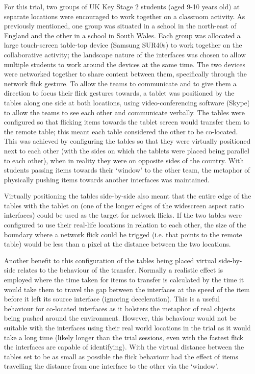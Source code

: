 \documentclass[a4paper,11pt]{article}
\begin{document}
For this trial, two groups of UK Key Stage 2 students (aged 9-10 years old) at separate locations were encouraged to work together on a classroom activity.
As previously mentioned, one group was situated in a school in the north-east of England and the other in a school in South Wales.
Each group was allocated a large touch-screen table-top device (Samsung SUR40s) to work together on the collaborative activity; the landscape nature of the interfaces was chosen to allow multiple students to work around the devices at the same time.
The two devices were networked together to share content between them, specifically through the network flick gesture.
To allow the teams to communicate and to give them a direction to focus their flick gestures towards, a tablet was positioned by the tables along one side at both locations, using video-conferencing software (Skype) to allow the teams to see each other and communicate verbally.
The tables were configured so that flicking items towards the tablet screen would transfer them to the remote table; this meant each table considered the other to be co-located.
This was achieved by configuring the tables so that they were virtually positioned next to each other (with the sides on which the tablets were placed being parallel to each other), when in reality they were on opposite sides of the country.
With students passing items towards their `window' to the other team, the metaphor of physically pushing items towards another interfaces was maintained.

Virtually positioning the tables side-by-side also meant that the entire edge of the tables with the tablet on (one of the longer edges of the widescreen aspect ratio interfaces) could be used as the target for network flicks.
If the two tables were configured to use their real-life locations in relation to each other, the size of the boundary where a network flick could be trigged (i.e. that points to the remote table) would be less than a pixel at the distance between the two locations.

Another benefit to this configuration of the tables being placed virtual side-by-side relates to the behaviour of the transfer.
Normally a realistic effect is employed where the time taken for items to transfer is calculated by the time it would take them to travel the gap between the interfaces at the speed of the item before it left its source interface (ignoring deceleration).
This is a useful behaviour for co-located interfaces as it bolsters the metaphor of real objects being pushed around the environment.
However, this behaviour would not be suitable with the interfaces using their real world locations in the trial as it would take a long time (likely longer than the trial sessions, even with the fastest flick the interfaces are capable of identifying).
With the virtual distance between the tables set to be as small as possible the flick behaviour had the effect of items travelling the distance from one interface to the other via the `window'.
\end{document}
